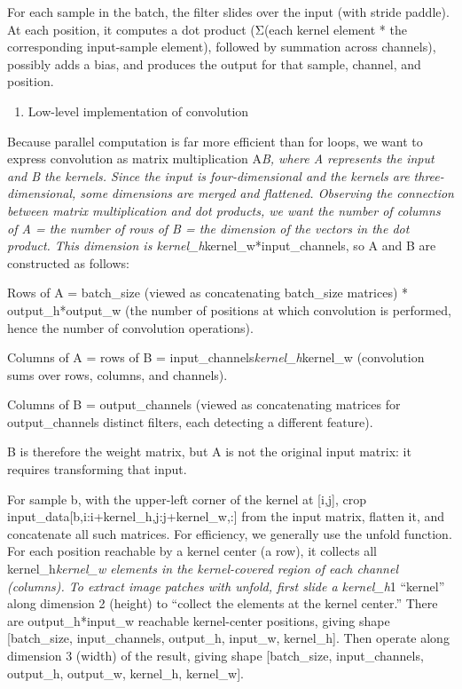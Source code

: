 For each sample in the batch, the filter slides over the input (with stride paddle). At each position, it computes a dot product (Σ(each kernel element * the corresponding input-sample element), followed by summation across channels), possibly adds a bias, and produces the output for that sample, channel, and position.

\begin{enumerate}
\def\labelenumi{(\arabic{enumi})}
\setcounter{enumi}{4}
\tightlist
\item
  Low-level implementation of convolution
\end{enumerate}

Because parallel computation is far more efficient than for loops, we want to express convolution as matrix multiplication A\emph{B, where A represents the input and B the kernels. Since the input is four-dimensional and the kernels are three-dimensional, some dimensions are merged and flattened. Observing the connection between matrix multiplication and dot products, we want the number of columns of A = the number of rows of B = the dimension of the vectors in the dot product. This dimension is kernel\_h}kernel\_w*input\_channels, so A and B are constructed as follows:

Rows of A = batch\_size (viewed as concatenating batch\_size matrices) * output\_h*output\_w (the number of positions at which convolution is performed, hence the number of convolution operations).

Columns of A = rows of B = input\_channels\emph{kernel\_h}kernel\_w (convolution sums over rows, columns, and channels).

Columns of B = output\_channels (viewed as concatenating matrices for output\_channels distinct filters, each detecting a different feature).

B is therefore the weight matrix, but A is not the original input matrix: it requires transforming that input.

For sample b, with the upper-left corner of the kernel at {[}i,j{]}, crop input\_data{[}b,i:i+kernel\_h,j:j+kernel\_w,:{]} from the input matrix, flatten it, and concatenate all such matrices. For efficiency, we generally use the unfold function. For each position reachable by a kernel center (a row), it collects all kernel\_h\emph{kernel\_w elements in the kernel-covered region of each channel (columns). To extract image patches with unfold, first slide a kernel\_h}1 ``kernel'' along dimension 2 (height) to ``collect the elements at the kernel center.'' There are output\_h*input\_w reachable kernel-center positions, giving shape {[}batch\_size, input\_channels, output\_h, input\_w, kernel\_h{]}. Then operate along dimension 3 (width) of the result, giving shape {[}batch\_size, input\_channels, output\_h, output\_w, kernel\_h, kernel\_w{]}.

